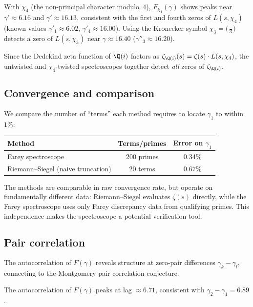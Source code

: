 \begin{observation}\label{obs:dirichlet}
With $\chi_4$ (the non-principal character modulo~$4$),
$F_{\chi_4}(\gamma)$ shows peaks near
$\gamma'\approx 6.16$ and $\gamma'\approx 16.13$,
consistent with the first and fourth zeros of $L(s,\chi_4)$
(known values $\gamma'_1\approx 6.02$, $\gamma'_4\approx 16.00$).
Using the Kronecker symbol $\chi_3 = \bigl(\frac{\cdot}{3}\bigr)$
detects a zero of $L(s,\chi_3)$ near $\gamma\approx 16.40$
($\gamma''_3\approx 16.20$).
\end{observation}

Since the Dedekind zeta function of $\Q(i)$ factors as
$\zeta_{\Q(i)}(s) = \zeta(s)\cdot L(s,\chi_4)$,
the untwisted and $\chi_4$-twisted spectroscopes together
detect \emph{all} zeros of $\zeta_{\Q(i)}$.

\subsection{Convergence and comparison}

We compare the number of ``terms'' each method requires
to locate $\gamma_1$ to within $1\%$:

\begin{center}
\begin{tabular}{lcc}
\toprule
Method & Terms/primes & Error on $\gamma_1$ \\
\midrule
Farey spectroscope & 200 primes & $0.34\%$ \\
Riemann--Siegel (naive truncation) & 20 terms & $0.67\%$ \\
\bottomrule
\end{tabular}
\end{center}

The methods are comparable in raw convergence rate, but operate on
fundamentally different data: Riemann--Siegel evaluates $\zeta(s)$
directly, while the Farey spectroscope uses only Farey discrepancy
data from qualifying primes.  This independence makes the
spectroscope a potential verification tool.

\subsection{Pair correlation}

The autocorrelation of $F(\gamma)$ reveals structure at zero-pair
differences $\gamma_k - \gamma_l$, connecting to the Montgomery pair
correlation conjecture.

\begin{observation}\label{obs:pair}
The autocorrelation of $F(\gamma)$ peaks at lag $\approx 6.71$,
consistent with $\gamma_2 - \gamma_1 = 6.89$.
\end{observation}
